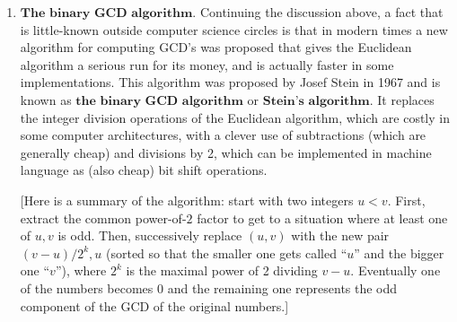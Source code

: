 \documentclass[11pt]{report}
\theoremstyle{plain}
\theoremstyle{definition}
\begin{document}
\begin{enumerate}[label=\arabic*.]
The continued fraction map described above is intimately related to the Euclidean algorithm for computing the greatest common divisor (GCD) of two integers, since iterating the map starting from a rational fraction $p/q$ reproduces precisely the sequence of quotients (and remainders, if one takes care to record them) in the execution of the Euclidean algorithm, and the last non-zero iteration $T^k(p/q)$ is of the form $1/d$, where $d$ is precisely the GCD of $p$ and $q$. Given the usefulness of the Euclidean algorithm and its historical status as one of the earliest algorithms ever described, is not surprising that already in the early days of the theory of algorithms (a.k.a.\ the 1960's) researchers were interested in giving a quantitative analysis of the running time of this venerable procedure. Such analyses lead directly to ergodic theoretic questions about the continued fraction map; the renewed interest in this classical problem has stimulated new and extremely interesting studies into the mathematics of the Gauss map. A highly readable account of these fascinating developments (the latest of which being less than 15 years old and still inspiring new research even in recent years) is told in Sections~4.5.2--4.5.3 of Vol.~II of Donald E.\ Knuth's celebrated book series \emph{The Art of Computer Programming}.
\item $\textbf{The binary GCD algorithm.}$ Continuing the discussion above, a fact that is little-known outside computer science circles is that in modern times a new algorithm for computing GCD's was proposed that gives the Euclidean algorithm a serious run for its money, and is actually faster in some implementations. This algorithm was proposed by Josef Stein in 1967 and is known as $\textbf{the binary GCD algorithm}$ or $\textbf{Stein's algorithm}$. It replaces the integer division operations of the Euclidean algorithm, which are costly in some computer architectures, with a clever use of subtractions (which are generally cheap) and divisions by 2, which can be implemented in machine language as (also cheap) bit shift operations.

[Here is a summary of the algorithm: start with two integers $u<v$. First, extract the common power-of-$2$ factor to get to a situation where at least one of $u,v$ is odd. Then, successively replace $(u,v)$ with the new pair $(v-u)/2^k,u$ (sorted so that the smaller one gets called ``$u$'' and the bigger one ``$v$''), where $2^k$ is the maximal power of 2 dividing $v-u$. Eventually one of the numbers becomes $0$ and the remaining one represents the odd component of the GCD of the original numbers.]


\end{enumerate}
\end{document}
